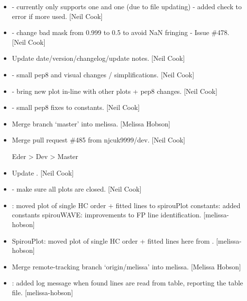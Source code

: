\documentclass[a4paper,10pt,english]{report}
\begin{document}
\begin{itemize}
\item {} 
 - currently only supports one  and one
 (due to file updating) - added check to error if more used.
{[}Neil Cook{]}

\item {} 
 - change bad mask from 0.999 to 0.5 to avoid NaN
fringing - Issue \#478. {[}Neil Cook{]}

\item {} 
Update date/version/changelog/update notes. {[}Neil Cook{]}

\item {} 
 - small pep8 and visual changes / simplifications. {[}Neil
Cook{]}

\item {} 
 - bring new plot in-line with other plots + pep8
changes. {[}Neil Cook{]}

\item {} 
 - small pep8 fixes to constants. {[}Neil Cook{]}

\item {} 
Merge branch ‘master’ into melissa. {[}Melissa Hobson{]}

\item {} 
Merge pull request \#485 from njcuk9999/dev. {[}Neil Cook{]}

Eder \textendash{}\textgreater{} Dev \textendash{}\textgreater{} Master

\item {} 
Update . {[}Neil Cook{]}

\item {} 
 - make sure all plots are closed. {[}Neil Cook{]}

\item {} 
: moved plot of single HC order + fitted lines to
spirouPlot constants: added  constants spirouWAVE:
improvements to FP line identification. {[}melissa-hobson{]}

\item {} 
SpirouPlot: moved plot of single HC order + fitted lines here from
. {[}melissa-hobson{]}

\item {} 
Merge remote-tracking branch ‘origin/melissa’ into melissa. {[}Melissa
Hobson{]}

\item {} 
: added log message when found lines are read from
table, reporting the table file. {[}melissa-hobson{]}

\end{itemize}
\end{document}
